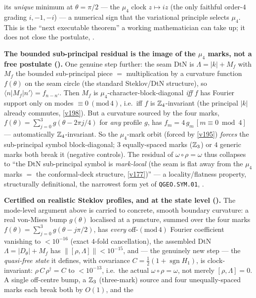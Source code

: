 its \emph{unique} minimum at $\theta=\pi/2$ --- the $\mu_4$ clock $z\mapsto iz$ (the only faithful order-$4$
grading $i,-1,-i$) --- a numerical sign that the variational principle selects $\mu_4$. This is the
``next executable theorem'' a working mathematician can take up; it does not close the postulate, \mO.
\par\smallskip\noindent\textbf{The bounded sub-principal residual is the image of the $\mu_4$ marks, not a
free postulate ().} One genuine step further: the seam DtN is
$\Lambda=|k|+M_f$ with $M_f$ the bounded sub-principal piece $=$ multiplication by a curvature function
$f(\theta)$ on the seam circle (the standard Steklov/DtN structure), so $\langle n|M_f|n'\rangle=f_{n-n'}$.
Then $M_f$ is $\mu_4$-character-block-diagonal \emph{iff} $f$ has Fourier support only on modes
$\equiv0\ (\mathrm{mod}\,4)$, i.e.\ iff $f$ is $\mathbb Z_4$-invariant (the principal $|k|$ already commutes,
\vref{v198}). But a curvature sourced by the four marks, $f(\theta)=\sum_{j=0}^{3}g(\theta-2\pi j/4)$ for
\emph{any} profile $g$, has $f_m=4\,g_m\,[m\equiv0\bmod4]$ --- automatically $\mathbb Z_4$-invariant. So the
$\mu_4$-mark orbit (forced by \vref{v195}) \emph{forces} the sub-principal symbol block-diagonal; $3$
equally-spaced marks ($\mathbb Z_3$) or $4$ generic marks both break it (negative controls). The residual of
$\omega\circ\rho=\omega$ thus collapses to ``the DtN sub-principal symbol is \emph{mark-local} (the seam is
flat away from the $\mu_4$ marks $=$ the conformal-deck structure, \vref{v177})'' --- a locality/flatness
property, structurally definitional, the narrowest form yet of \texttt{QGEO.SYM.01}, \mO.
\par\smallskip\noindent\textbf{Certified on realistic Steklov profiles, and at the state level
().} The mode-level argument above is carried to concrete, smooth boundary
curvature: a real von-Mises bump $g(\theta)$ localised at a puncture, summed over the four marks
$f(\theta)=\sum_{j=0}^{3}g(\theta-j\pi/2)$, has \emph{every} off-$(\mathrm{mod}\,4)$ Fourier coefficient
vanishing to $<10^{-16}$ (exact $4$-fold cancellation), the assembled DtN $\Lambda=|D_\theta|+M_f$ has
$\|[\rho,\Lambda]\|<10^{-15}$, and --- the genuinely new step --- the \emph{quasi-free state} it defines,
with covariance $C=\tfrac12(1+\operatorname{sgn}H_1)$, is clock-invariant: $\rho\,C\,\rho^\dagger=C$ to
$<10^{-13}$, i.e.\ the actual $\omega\circ\rho=\omega$, not merely $[\rho,\Lambda]=0$. A single off-centre
bump, a $\mathbb Z_3$ (three-mark) source and four unequally-spaced marks each break both by $O(1)$, and the
